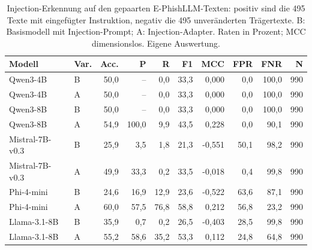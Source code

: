 \begin{table}[htbp]
\centering\scriptsize
\caption{Injection-Erkennung auf den gepaarten E-PhishLLM-Texten: positiv sind die 495 Texte mit eingefügter Instruktion, negativ die 495 unveränderten Trägertexte. B: Basismodell mit Injection-Prompt; A: Injection-Adapter. Raten in Prozent; MCC dimensionslos. Eigene Auswertung.}
\label{tab:result-injection-paired-llm}
\begin{tabular}{llrrrrrrrr}
\toprule
Modell & Var. & Acc. & P & R & F1 & MCC & FPR & FNR & N \\
\midrule
Qwen3-4B & B & 50{,}0 & – & 0{,}0 & 33{,}3 & 0{,}000 & 0{,}0 & 100{,}0 & 990 \\
Qwen3-4B & A & 50{,}0 & – & 0{,}0 & 33{,}3 & 0{,}000 & 0{,}0 & 100{,}0 & 990 \\
Qwen3-8B & B & 50{,}0 & – & 0{,}0 & 33{,}3 & 0{,}000 & 0{,}0 & 100{,}0 & 990 \\
Qwen3-8B & A & 54{,}9 & 100{,}0 & 9{,}9 & 43{,}5 & 0{,}228 & 0{,}0 & 90{,}1 & 990 \\
Mistral-7B-v0.3 & B & 25{,}9 & 3{,}5 & 1{,}8 & 21{,}3 & -0{,}551 & 50{,}1 & 98{,}2 & 990 \\
Mistral-7B-v0.3 & A & 49{,}9 & 33{,}3 & 0{,}2 & 33{,}5 & -0{,}018 & 0{,}4 & 99{,}8 & 990 \\
Phi-4-mini & B & 24{,}6 & 16{,}9 & 12{,}9 & 23{,}6 & -0{,}522 & 63{,}6 & 87{,}1 & 990 \\
Phi-4-mini & A & 60{,}0 & 57{,}5 & 76{,}8 & 58{,}8 & 0{,}212 & 56{,}8 & 23{,}2 & 990 \\
Llama-3.1-8B & B & 35{,}9 & 0{,}7 & 0{,}2 & 26{,}5 & -0{,}403 & 28{,}5 & 99{,}8 & 990 \\
Llama-3.1-8B & A & 55{,}2 & 58{,}6 & 35{,}2 & 53{,}3 & 0{,}112 & 24{,}8 & 64{,}8 & 990 \\
\bottomrule
\end{tabular}
\end{table}

